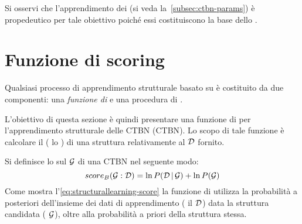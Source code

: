 Si osservi che l'apprendimento dei  (si veda la~\autoref{subsec:ctbn-params}) è propedeutico per tale obiettivo poiché essi costituiscono la base dello .

\cleardoublepage
\section{Funzione di scoring}\label{sec:ctbn-structurallearning-score}
Qualsiasi processo di apprendimento strutturale basato su  è costituito da due componenti: una \emph{funzione di } e una procedura di .

L'obiettivo di questa sezione è quindi presentare una funzione di  per l'apprendimento strutturale delle \acl{CTBN} (\acs{CTBN}). Lo scopo di tale funzione è calcolare il  (\ie{} lo ) di una struttura relativamente al \emph{\keyword{\trs{}}} $\mathcal{D}$ fornito.

Si definisce lo \emph{} sul  $\mathcal{G}$ di una \acs{CTBN} nel seguente modo:
\begin{equation}\label{eq:structurallearning-score}
score_B(\mathcal{G}:\mathcal{D})=\ln{P(\mathcal{D}\,\arrowvert\,\mathcal{G})} + \ln{P(\mathcal{G})}
\end{equation}
Come mostra l'\autoref{eq:structurallearning-score} la funzione di  utilizza la probabilità a posteriori dell'insieme dei dati di apprendimento (\ie{} il \trs{} $\mathcal{D}$) data la struttura candidata (\ie{} $\mathcal{G}$), oltre alla probabilità a priori della struttura stessa.

